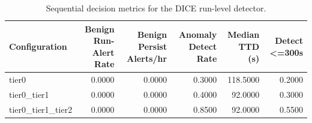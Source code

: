 \begin{table}[t]
\centering
\caption{Sequential decision metrics for the DICE run-level detector.}
\label{tab:dice_sequential_metrics}
\footnotesize
\begin{tabular}{lrrrrr}
\toprule
Configuration & Benign Run-Alert Rate & Benign Persist Alerts/hr & Anomaly Detect Rate & Median TTD (s) & Detect <=300s \\
\midrule
tier0 & 0.0000 & 0.0000 & 0.3000 & 118.5000 & 0.2000 \\
tier0_tier1 & 0.0000 & 0.0000 & 0.4000 & 92.0000 & 0.3000 \\
tier0_tier1_tier2 & 0.0000 & 0.0000 & 0.8500 & 92.0000 & 0.5500 \\
\bottomrule
\end{tabular}

\end{table}
